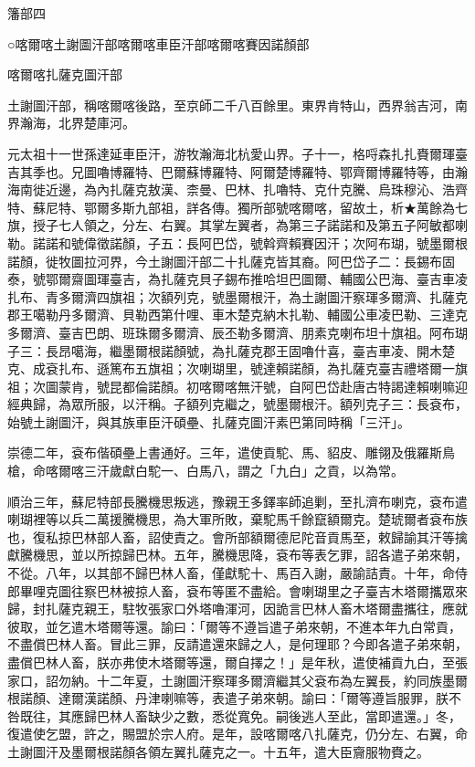 
\begin{pinyinscope}
籓部四

○喀爾喀土謝圖汗部喀爾喀車臣汗部喀爾喀賽因諾顏部

喀爾喀扎薩克圖汗部

土謝圖汗部，稱喀爾喀後路，至京師二千八百餘里。東界肯特山，西界翁吉河，南界瀚海，北界楚庫河。

元太祖十一世孫達延車臣汗，游牧瀚海北杭愛山界。子十一，格哷森扎扎賚爾琿臺吉其季也。兄圖嚕博羅特、巴爾蘇博羅特、阿爾楚博羅特、鄂齊爾博羅特等，由瀚海南徙近邊，為內扎薩克敖漢、柰曼、巴林、扎嚕特、克什克騰、烏珠穆沁、浩齊特、蘇尼特、鄂爾多斯九部祖，詳各傳。獨所部號喀爾喀，留故土，析★萬餘為七旗，授子七人領之，分左、右翼。其掌左翼者，為第三子諾諾和及第五子阿敏都喇勒。諾諾和號偉徵諾顏，子五：長阿巴岱，號斡齊賴賽因汗；次阿布瑚，號墨爾根諾顏，徙牧圖拉河界，今土謝圖汗部二十扎薩克皆其裔。阿巴岱子二：長錫布固泰，號鄂爾齋圖琿臺吉，為扎薩克貝子錫布推哈坦巴圖爾、輔國公巴海、臺吉車凌扎布、青多爾濟四旗祖；次額列克，號墨爾根汗，為土謝圖汗察琿多爾濟、扎薩克郡王噶勒丹多爾濟、貝勒西第什哩、車木楚克納木扎勒、輔國公車凌巴勒、三達克多爾濟、臺吉巴朗、班珠爾多爾濟、辰丕勒多爾濟、朋素克喇布坦十旗祖。阿布瑚子三：長昂噶海，繼墨爾根諾顏號，為扎薩克郡王固嚕什喜，臺吉車凌、開木楚克、成袞扎布、遜篤布五旗祖；次喇瑚里，號達賴諾顏，為扎薩克臺吉禮塔爾一旗祖；次圖蒙肯，號昆都倫諾顏。初喀爾喀無汗號，自阿巴岱赴唐古特謁達賴喇嘛迎經典歸，為眾所服，以汗稱。子額列克繼之，號墨爾根汗。額列克子三：長袞布，始號土謝圖汗，與其族車臣汗碩壘、扎薩克圖汗素巴第同時稱「三汗」。

崇德二年，袞布偕碩壘上書通好。三年，遣使貢駝、馬、貂皮、雕翎及俄羅斯鳥槍，命喀爾喀三汗歲獻白駝一、白馬八，謂之「九白」之貢，以為常。

順治三年，蘇尼特部長騰機思叛逃，豫親王多鐸率師追剿，至扎濟布喇克，袞布遣喇瑚裡等以兵二萬援騰機思，為大軍所敗，棄駝馬千餘竄額爾克。楚琥爾者袞布族也，復私掠巴林部人畜，詔使責之。會所部額爾德尼陀音貢馬至，敕歸諭其汗等擒獻騰機思，並以所掠歸巴林。五年，騰機思降，袞布等表乞罪，詔各遣子弟來朝，不從。八年，以其部不歸巴林人畜，僅獻駝十、馬百入謝，嚴諭詰責。十年，命侍郎畢哩克圖往察巴林被掠人畜，袞布等匿不盡給。會喇瑚里之子臺吉木塔爾攜眾來歸，封扎薩克親王，駐牧張家口外塔嚕渾河，因詭言巴林人畜木塔爾盡攜往，應就彼取，並乞遣木塔爾等還。諭曰：「爾等不遵旨遣子弟來朝，不進本年九白常貢，不盡償巴林人畜。冒此三罪，反請遣還來歸之人，是何理耶？今即各遣子弟來朝，盡償巴林人畜，朕亦弗使木塔爾等還，爾自擇之！」是年秋，遣使補貢九白，至張家口，詔勿納。十二年夏，土謝圖汗察琿多爾濟繼其父袞布為左翼長，約同族墨爾根諾顏、達爾漢諾顏、丹津喇嘛等，表遣子弟來朝。諭曰：「爾等遵旨服罪，朕不咎既往，其應歸巴林人畜缺少之數，悉從寬免。嗣後逃人至此，當即遣還。」冬，復遣使乞盟，許之，賜盟於宗人府。是年，設喀爾喀八扎薩克，仍分左、右翼，命土謝圖汗及墨爾根諾顏各領左翼扎薩克之一。十五年，遣大臣齎服物賚之。


\end{pinyinscope}
